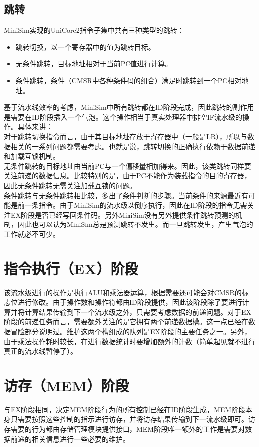 \documentclass[12pt,a4paper,Flow]{report}
\begin{document}
\subsection{跳转}
MiniSim实现的UniCore2指令子集中共有三种类型的跳转：
\begin{itemize}
\item 跳转切换，以一个寄存器中的值为跳转目标。
\item 无条件跳转，目标地址相对于当前PC值进行计算。
\item 条件跳转，条件（CMSR中各种条件码的组合）满足时跳转到一个PC相对地址。
\end{itemize}
基于流水线效率的考虑，MiniSim中所有跳转都在ID阶段完成，因此跳转的副作用是需要在ID阶段插入一个气泡。这个操作相当于真实处理器中排空IF流水级的操作。具体来讲：\\
\indent 对于跳转切换指令而言，由于其目标地址存放于寄存器中（一般是LR），所以与数据相关的一系列问题都需要考虑。也就是说，跳转切换的正确执行依赖于数据前递和加载互锁机制。\\
\indent 无条件跳转的目标地址由当前PC与一个偏移量相加得来。因此，该类跳转同样要关注前递的数据信息。比较特别的是，由于PC不能作为装载指令的目的寄存器，因此无条件跳转无需关注加载互锁的问题。\\
\indent 条件跳转与无条件跳转相比较，多出了条件判断的步骤。当前条件的来源最近有可能是前一条指令。由于MiniSim的流水级以倒序执行，因此在ID阶段的指令无需关注EX阶段是否已经写回条件码。另外MiniSim没有另外提供条件跳转预测的机制，因此也可以认为MiniSim总是预测跳转不发生。而一旦跳转发生，产生气泡的工作就必不可少。
\section{指令执行（EX）阶段}
该流水级进行的操作是执行ALU和乘法器运算，根据需要还可能会对CMSR的标志位进行修改。由于操作数和操作符都由ID阶段提供，因此该阶段除了要进行计算并将计算结果传输到下一个流水级之外，只需要考虑数据的前递问题。对于EX阶段的前递任务而言，需要额外关注的是它拥有两个前递数据槽。这一点已经在数据冒险部分说明过。维护这两个槽组成的队列是EX阶段的主要任务之一。另外，由于乘法操作耗时较长，在进行数据统计时要增加额外的计数（简单起见就不进行真正的流水线暂停了）。
\section{访存（MEM）阶段}
与EX阶段相同，决定MEM阶段行为的所有控制已经在ID阶段生成，MEM阶段本身只需要按照这些控制的指示进行访存，并将访存结果传输到下一流水级即可。访存需要的行为都由存储管理模块提供接口，MEM阶段唯一额外的工作是需要对数据前递的相关信息进行一些必要的维护。
\end{document}
